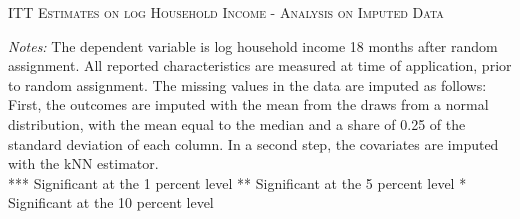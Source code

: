\begin{table}[t!]
\centering
\caption{\textsc{ITT Estimates on log Household Income - Analysis on Imputed Data}}



\medskip
\begin{adjustbox}{width=0.825\textwidth, totalheight=\textheight, keepaspectratio}

\end{adjustbox}

\label{tab:table_kNN_withcontr}
\bigskip
\raggedright
\footnotesize
\textit{Notes:} The dependent variable is log household income 18 months after random assignment. All reported characteristics are measured at time of application, prior to random assignment. The missing values in the data are imputed as follows: First, the outcomes are imputed with the mean from the draws from a normal distribution, with the mean equal to the median and a share of 0.25 of the standard deviation of each column. In a second step, the covariates are imputed with the \ac{kNN} estimator. \\
*** Significant at the 1 percent level ** Significant at the 5 percent level * Significant at the 10 percent level
\end{table}


